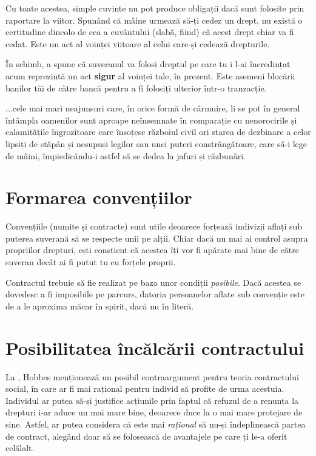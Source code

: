 \documentclass[12pt]{article}
\begin{document}
	 	Cu toate acestea, simple cuvinte nu pot produce obligații \parencite{Hobbesa} dacă sunt folosite prin raportare la viitor. Spunând că mâine urmează să-ți cedez un drept, nu există o certitudine dincolo de cea a cuvântului (slabă, fiind) că acest drept chiar va fi cedat. Este un act al voinței viitoare al celui care-și cedează drepturile.
	 	
	 	În schimb, a spune că suveranul va folosi dreptul pe care tu i l-ai încredințat acum reprezintă un act \textbf{sigur} al voinței tale, în prezent. Este asemeni blocării banilor tăi de către bancă pentru a fi folosiți ulterior într-o tranzacție. 
	 	
	 	\begin{displayquote}
	 		...cele mai mari neajunsuri care, în orice formă de cârmuire, li se pot în general întâmpla oamenilor sunt aproape neînsemnate în comparație cu nenorocirile și calamitățile îngrozitoare care însoțesc războiul civil ori starea de dezbinare a celor lipsiți de stăpân și nesupuși legilor sau unei puteri constrângătoare, care să-i lege de mâini, împiedicându-i astfel să se dedea la jafuri și răzbunări.
	 	\end{displayquote}
	 	
	 	\section{Formarea convențiilor}
	 	
	 	Convențiile (numite și \dedouble contracte\sqtworight) sunt utile deoarece forțează indivizii aflați sub puterea suverană să se respecte unii pe alții. Chiar dacă nu mai ai control asupra propriilor drepturi, ești conștient că acestea îți vor fi apărate mai bine de către suveran decât ai fi putut tu cu forțele proprii.\par
	 	
	 	Contractul trebuie să fie realizat pe baza unor condiții \textit{posibile}. Dacă acestea se dovedesc a fi imposibile pe parcurs, datoria persoanelor aflate sub convenție este de a le aproxima măcar în spirit, dacă nu în literă. 
	 	
	 	\section{Posibilitatea încălcării contractului}
	 	
	 	La \cite[p. 52]{Hobbesa}, Hobbes menționează un posibil contraargument pentru teoria contractului social, în care ar fi mai rațional pentru individ să profite de urma acestuia. Individul ar putea să-și justifice acțiunile prin faptul că refuzul de a renunța la drepturi i-ar aduce un mai mare bine, deoarece duce la o mai mare protejare de sine. Astfel, ar putea considera că este mai \textit{rațional} să nu-și îndeplinească partea de contract, alegând doar să se folosească de avantajele pe care ți le-a oferit celălalt.\par
	 	
\end{document}
